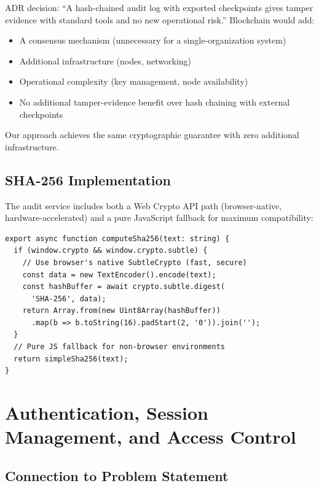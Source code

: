 \documentclass[12pt, a4paper]{report}
\begin{document}
\begin{designbox}[title={Why Not Blockchain?}]
ADR decision: ``A hash-chained audit log with exported checkpoints gives tamper evidence with standard tools and no new operational risk.'' Blockchain would add:
\begin{itemize}
  \item A consensus mechanism (unnecessary for a single-organization system)
  \item Additional infrastructure (nodes, networking)
  \item Operational complexity (key management, node availability)
  \item No additional tamper-evidence benefit over hash chaining with external checkpoints
\end{itemize}
Our approach achieves the same cryptographic guarantee with zero additional infrastructure.
\end{designbox}

\section{SHA-256 Implementation}

The audit service includes both a Web Crypto API path (browser-native, hardware-accelerated) and a pure JavaScript fallback for maximum compatibility:

\begin{lstlisting}[caption={Dual SHA-256 Implementation Strategy}, label={lst:sha256}]
export async function computeSha256(text: string) {
  if (window.crypto && window.crypto.subtle) {
    // Use browser's native SubtleCrypto (fast, secure)
    const data = new TextEncoder().encode(text);
    const hashBuffer = await crypto.subtle.digest(
      'SHA-256', data);
    return Array.from(new Uint8Array(hashBuffer))
      .map(b => b.toString(16).padStart(2, '0')).join('');
  }
  // Pure JS fallback for non-browser environments
  return simpleSha256(text);
}
\end{lstlisting}


\chapter{Authentication, Session Management, and Access Control}

\section{Connection to Problem Statement}
\end{document}
